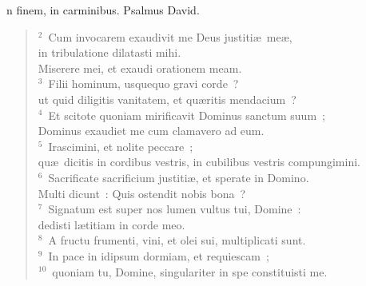 \bchapter
{}n finem, in carminibus. Psalmus David.
\begin{flushleft}\begin{verse}\vspace{6pt}${}^{2}$~Cum invocarem exaudivit me Deus justiti\ae\ me\ae ,\\ in tribulatione dilatasti mihi.\\ Miserere mei, et exaudi orationem meam.\\
${}^{3}$~Filii hominum, usquequo gravi corde~?\\ ut quid diligitis vanitatem, et qu\ae ritis mendacium~?\\
${}^{4}$~Et scitote quoniam mirificavit Dominus sanctum suum~;\\ Dominus exaudiet me cum clamavero ad eum.\\
${}^{5}$~Irascimini, et nolite peccare~;\\ qu\ae\ dicitis in cordibus vestris, in cubilibus vestris compungimini.\\
${}^{6}$~Sacrificate sacrificium justiti\ae , et sperate in Domino.\\ Multi dicunt~: Quis ostendit nobis bona~?\\
${}^{7}$~Signatum est super nos lumen vultus tui, Domine~:\\ dedisti l\ae titiam in corde meo.\\
${}^{8}$~A fructu frumenti, vini, et olei sui, multiplicati sunt.\\
${}^{9}$~In pace in idipsum dormiam, et requiescam~;\\
${}^{10}$~quoniam tu, Domine, singulariter in spe constituisti me.\end{verse}\end{flushleft}



